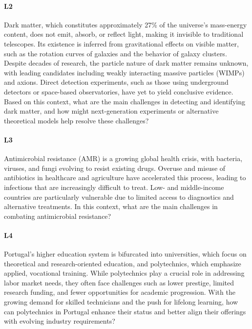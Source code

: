 \paragraph{L2} Dark matter, which constitutes approximately 27\% of the universe's mass-energy
               content, does not emit, absorb, or reflect light, making it invisible to traditional
               telescopes. Its existence is inferred from gravitational effects on visible matter,
               such as the rotation curves of galaxies and the behavior of galaxy clusters. Despite
               decades of research, the particle nature of dark matter remains unknown, with leading
               candidates including weakly interacting massive particles (WIMPs) and axions. Direct
               detection experiments, such as those using underground detectors or space-based
               observatories, have yet to yield conclusive evidence. Based on this context, what are
               the main challenges in detecting and identifying dark matter, and how might
               next-generation experiments or alternative theoretical models help resolve these
               challenges?

\paragraph{L3} Antimicrobial resistance (AMR) is a growing global health crisis, with bacteria,
               viruses, and fungi evolving to resist existing drugs. Overuse and misuse of
               antibiotics in healthcare and agriculture have accelerated this process, leading to
               infections that are increasingly difficult to treat. Low- and middle-income countries
               are particularly vulnerable due to limited access to diagnostics and alternative
               treatments. In this context, what are the main challenges in combating antimicrobial
               resistance?

\paragraph{L4} Portugal's higher education system is bifurcated into universities, which focus on
               theoretical and research-oriented education, and polytechnics, which emphasize
               applied, vocational training. While polytechnics play a crucial role in addressing
               labor market needs, they often face challenges such as lower prestige, limited
               research funding, and fewer opportunities for academic progression. With the growing
               demand for skilled technicians and the push for lifelong learning, how can
               polytechnics in Portugal enhance their status and better align their offerings with
               evolving industry requirements?
